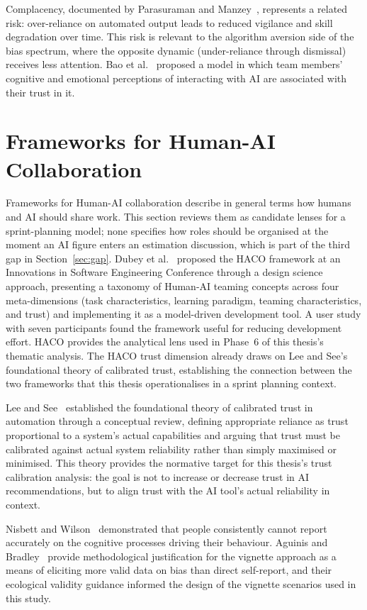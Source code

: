 \documentclass[a4paper,twoside]{bth}
\begin{document}
Complacency, documented by Parasuraman and Manzey~\cite{parasuraman2010complacency}, represents a related risk: over-reliance on automated output leads to reduced vigilance and skill degradation over time. This risk is relevant to the algorithm aversion side of the bias spectrum, where the opposite dynamic (under-reliance through dismissal) receives less attention. Bao et al.~\cite{bao2021investigating} proposed a model in which team members' cognitive and emotional perceptions of interacting with AI are associated with their trust in it.

\section{Frameworks for Human-AI Collaboration}

Frameworks for Human-AI collaboration describe in general terms how humans and AI should share work. This section reviews them as candidate lenses for a sprint-planning model; none specifies how roles should be organised at the moment an AI figure enters an estimation discussion, which is part of the third gap in Section~\ref{sec:gap}. Dubey et al.~\cite{dubey2020haco} proposed the HACO framework at an Innovations in Software Engineering Conference through a design science approach, presenting a taxonomy of Human-AI teaming concepts across four meta-dimensions (task characteristics, learning paradigm, teaming characteristics, and trust) and implementing it as a model-driven development tool. A user study with seven participants found the framework useful for reducing development effort. HACO provides the analytical lens used in Phase~6 of this thesis's thematic analysis. The HACO trust dimension already draws on Lee and See's~\cite{lee2004trust} foundational theory of calibrated trust, establishing the connection between the two frameworks that this thesis operationalises in a sprint planning context.

Lee and See~\cite{lee2004trust} established the foundational theory of calibrated trust in automation through a conceptual review, defining appropriate reliance as trust proportional to a system's actual capabilities and arguing that trust must be calibrated against actual system reliability rather than simply maximised or minimised. This theory provides the normative target for this thesis's trust calibration analysis: the goal is not to increase or decrease trust in AI recommendations, but to align trust with the AI tool's actual reliability in context.

Nisbett and Wilson~\cite{nisbett1977telling} demonstrated that people consistently cannot report accurately on the cognitive processes driving their behaviour. Aguinis and Bradley~\cite{aguinis2014best} provide methodological justification for the vignette approach as a means of eliciting more valid data on bias than direct self-report, and their ecological validity guidance informed the design of the vignette scenarios used in this study.
\end{document}
